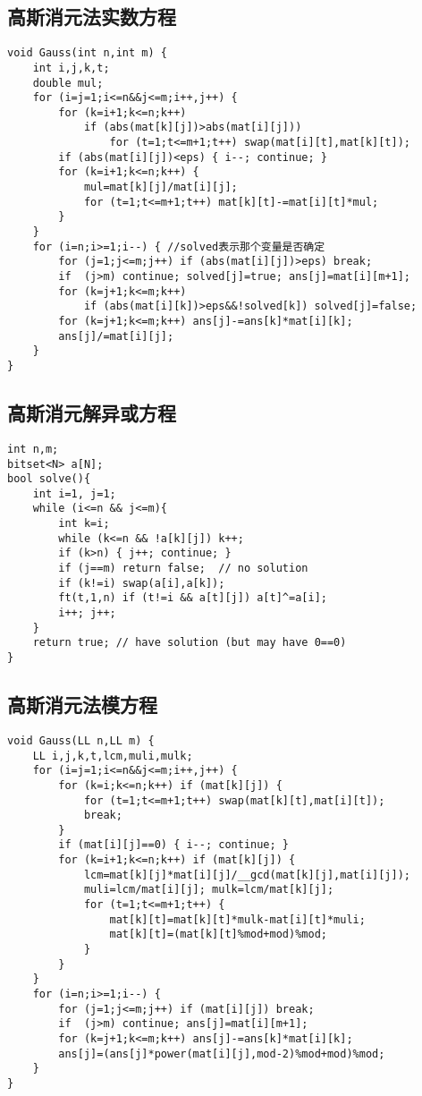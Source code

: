 \documentclass[landscape,a4paper]{article}
\begin{document}
\subsection{高斯消元法实数方程}
\begin{lstlisting}
void Gauss(int n,int m) {
	int i,j,k,t;
	double mul;
	for (i=j=1;i<=n&&j<=m;i++,j++) {
		for (k=i+1;k<=n;k++)
			if (abs(mat[k][j])>abs(mat[i][j]))
				for (t=1;t<=m+1;t++) swap(mat[i][t],mat[k][t]);
		if (abs(mat[i][j])<eps) { i--; continue; }
		for (k=i+1;k<=n;k++) {
			mul=mat[k][j]/mat[i][j];
			for (t=1;t<=m+1;t++) mat[k][t]-=mat[i][t]*mul;
		}
	}
	for (i=n;i>=1;i--) { //solved表示那个变量是否确定
		for (j=1;j<=m;j++) if (abs(mat[i][j])>eps) break;
		if  (j>m) continue; solved[j]=true; ans[j]=mat[i][m+1];
		for (k=j+1;k<=m;k++)
			if (abs(mat[i][k])>eps&&!solved[k]) solved[j]=false;
		for (k=j+1;k<=m;k++) ans[j]-=ans[k]*mat[i][k];
		ans[j]/=mat[i][j];
	}
}
\end{lstlisting}

\subsection{高斯消元解异或方程}
\begin{lstlisting}
int n,m;
bitset<N> a[N];
bool solve(){
	int i=1, j=1;	
	while (i<=n && j<=m){
		int k=i;
		while (k<=n && !a[k][j]) k++;
		if (k>n) { j++; continue; }
		if (j==m) return false;  // no solution
		if (k!=i) swap(a[i],a[k]);
		ft(t,1,n) if (t!=i && a[t][j]) a[t]^=a[i];
		i++; j++;
	}
	return true; // have solution (but may have 0==0)
}
\end{lstlisting}

\subsection{高斯消元法模方程}
\begin{lstlisting}
void Gauss(LL n,LL m) {
	LL i,j,k,t,lcm,muli,mulk;
	for (i=j=1;i<=n&&j<=m;i++,j++) {
		for (k=i;k<=n;k++) if (mat[k][j]) {
			for (t=1;t<=m+1;t++) swap(mat[k][t],mat[i][t]);
			break;
		}
		if (mat[i][j]==0) { i--; continue; }
		for (k=i+1;k<=n;k++) if (mat[k][j]) {
			lcm=mat[k][j]*mat[i][j]/__gcd(mat[k][j],mat[i][j]);
			muli=lcm/mat[i][j]; mulk=lcm/mat[k][j];
			for (t=1;t<=m+1;t++) {
				mat[k][t]=mat[k][t]*mulk-mat[i][t]*muli;
				mat[k][t]=(mat[k][t]%mod+mod)%mod;
			}
		}
	}
	for (i=n;i>=1;i--) {
		for (j=1;j<=m;j++) if (mat[i][j]) break;
		if  (j>m) continue; ans[j]=mat[i][m+1];
		for (k=j+1;k<=m;k++) ans[j]-=ans[k]*mat[i][k];
		ans[j]=(ans[j]*power(mat[i][j],mod-2)%mod+mod)%mod;
	}
}
\end{lstlisting}
\end{document}
